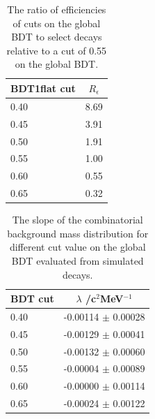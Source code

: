 \begin{table}[ht]
\begin{center}
\begin{tabular}{|l|c|}
\hline
BDT1flat cut & $R_{\epsilon}$ \\ \hline 
0.40 & 8.69 \\
0.45 & 3.91 \\
0.50 & 1.91 \\
0.55 & 1.00 \\
0.60 & 0.55 \\
0.65 & 0.32 \\ \hline
\end{tabular}
\caption{The ratio of efficiencies of cuts on the global BDT to select \bbbarmumux decays relative to a cut of 0.55 on the global BDT. }
\label{tab:EfficiencyRatioCombBG}
\end{center}
\end{table}

\begin{table}[ht]
\begin{center}
\begin{tabular}{|l|c|}
\hline
BDT cut & $\lambda$ /c$^{2}$MeV$^{-1}$\\ \hline \hline
0.40 & -0.00114 $\pm$ 0.00028 \\
0.45 & -0.00129 $\pm$ 0.00041 \\
0.50 & -0.00132 $\pm$ 0.00060 \\
0.55 & -0.00004 $\pm$ 0.00089 \\
0.60 & -0.00000 $\pm$ 0.00114 \\
0.65 & -0.00024 $\pm$ 0.00122 \\ \hline
\end{tabular}
\caption{The slope of the combinatorial background mass distribution for different cut value on the global BDT evaluated from \bbbarmumux simulated decays.}
\label{tab:CBGSlopeBDT}
\end{center}
\end{table}

